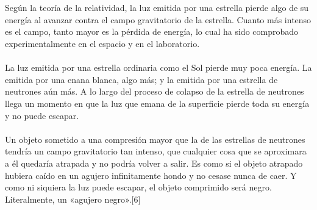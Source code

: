\documentclass[12pt]{article}
\begin{document}
\\\\
Según la teoría de la relatividad, la luz emitida por una estrella pierde algo de su energía al avanzar contra el campo gravitatorio de la estrella. Cuanto más intenso es el campo, tanto mayor es la pérdida de energía, lo cual ha sido comprobado experimentalmente en el espacio y en el laboratorio.\\\\
La luz emitida por una estrella ordinaria como el Sol pierde muy poca energía. La emitida por una enana blanca, algo más; y la emitida por una estrella de neutrones aún más. A lo largo del proceso de colapso de la estrella de neutrones llega un momento en que la luz que emana de la superficie pierde toda su energía y no puede escapar.
\\\\
Un objeto sometido a una compresión mayor que la de las estrellas de neutrones tendría un campo gravitatorio tan intenso, que cualquier cosa que se aproximara a él quedaría atrapada y no podría volver a salir. Es como si el objeto atrapado hubiera caído en un agujero infinitamente hondo y no cesase nunca de caer. Y como ni siquiera la luz puede escapar, el objeto comprimido será negro. Literalmente, un «agujero negro».[6]
\\%
\end{document}
